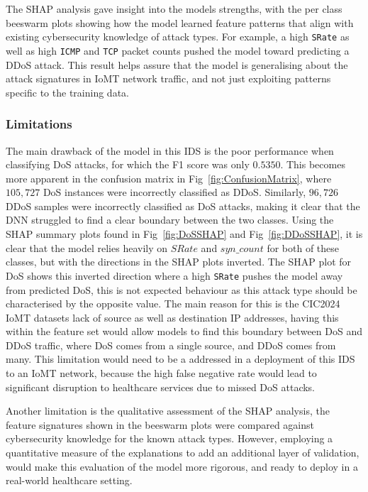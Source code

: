\documentclass[11pt,a4paper]{article}
\begin{document}
The SHAP analysis gave insight into the models strengths, with the per class beeswarm plots showing how the model learned feature patterns that align with existing cybersecurity knowledge of attack types. For example, a high \texttt{SRate} as well as high \texttt{ICMP} and \texttt{TCP} packet counts pushed the model toward predicting a DDoS attack. This result helps assure that the model is generalising about the attack signatures in IoMT network traffic, and not just exploiting patterns specific to the training data.

\subsubsection{Limitations}
The main drawback of the model in this IDS is the poor performance when classifying DoS attacks, for which the F1 score was only $0.5350$. This becomes more apparent in the confusion matrix in Fig~\ref{fig:ConfusionMatrix}, where $105,727$ DoS instances were incorrectly classified as DDoS. Similarly, $96,726$ DDoS samples were incorrectly classified as DoS attacks, making it clear that the DNN struggled to find a clear boundary between the two classes. Using the SHAP summary plots found in Fig~\ref{fig:DoSSHAP} and Fig~\ref{fig:DDoSSHAP}, it is clear that the model relies heavily on $SRate$ and $syn\_count$ for both of these classes, but with the directions in the SHAP plots inverted. The SHAP plot for DoS shows this inverted direction where a high \texttt{SRate} pushes the model away from predicted DoS, this is not expected behaviour as this attack type should be characterised by the opposite value. The main reason for this is the CIC2024 IoMT datasets lack of source as well as destination IP addresses, having this within the feature set would allow models to find this boundary between DoS and DDoS traffic, where DoS comes from a single source, and DDoS comes from many. This limitation would need to be a addressed in a deployment of this IDS to an IoMT network, because the high false negative rate would lead to significant disruption to healthcare services due to missed DoS attacks.

Another limitation is the qualitative assessment of the SHAP analysis, the feature signatures shown in the beeswarm plots were compared against cybersecurity knowledge for the known attack types. However, employing a quantitative measure of the explanations to add an additional layer of validation, would make this evaluation of the model more rigorous, and ready to deploy in a real-world healthcare setting.
\end{document}

